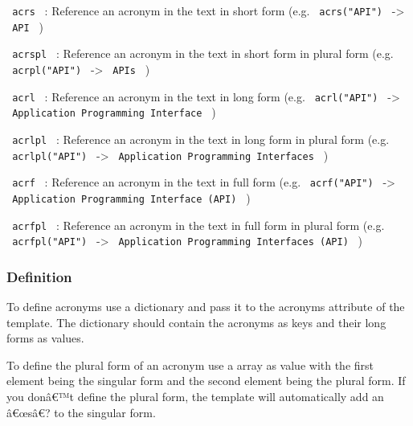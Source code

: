 \texttt{\ acrs\ } : Reference an acronym in the text in short form (e.g.
\texttt{\ acrs("API")\ } -\textgreater{} \texttt{\ API\ } )

\texttt{\ acrspl\ } : Reference an acronym in the text in short form in
plural form (e.g. \texttt{\ acrpl("API")\ } -\textgreater{}
\texttt{\ APIs\ } )

\texttt{\ acrl\ } : Reference an acronym in the text in long form (e.g.
\texttt{\ acrl("API")\ } -\textgreater{}
\texttt{\ Application\ Programming\ Interface\ } )

\texttt{\ acrlpl\ } : Reference an acronym in the text in long form in
plural form (e.g. \texttt{\ acrlpl("API")\ } -\textgreater{}
\texttt{\ Application\ Programming\ Interfaces\ } )

\texttt{\ acrf\ } : Reference an acronym in the text in full form (e.g.
\texttt{\ acrf("API")\ } -\textgreater{}
\texttt{\ Application\ Programming\ Interface\ (API)\ } )

\texttt{\ acrfpl\ } : Reference an acronym in the text in full form in
plural form (e.g. \texttt{\ acrfpl("API")\ } -\textgreater{}
\texttt{\ Application\ Programming\ Interfaces\ (API)\ } )

\subsubsection{Definition}\label{definition}

To define acronyms use a dictionary and pass it to the acronyms
attribute of the template. The dictionary should contain the acronyms as
keys and their long forms as values.

\begin{Shaded}
\begin{Highlighting}[]
\NormalTok{)}
\end{Highlighting}
\end{Shaded}

To define the plural form of an acronym use a array as value with the
first element being the singular form and the second element being the
plural form. If you donâ€™t define the plural form, the template will
automatically add an â€œsâ€? to the singular form.

\begin{Shaded}
\begin{Highlighting}[]
\NormalTok{)}
\end{Highlighting}
\end{Shaded}


